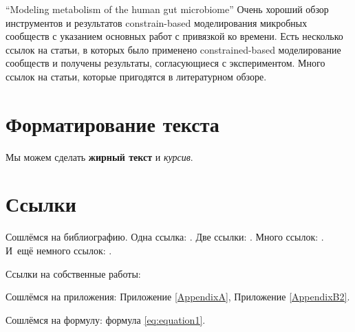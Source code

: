 “Modeling metabolism of the human gut microbiome”
Очень хороший обзор инструментов и результатов constrain-based моделирования микробных сообществ с указанием основных работ с привязкой ко времени. Есть несколько ссылок на статьи, в которых было применено constrained-based моделирование сообществ и получены результаты, согласующиеся с экспериментом. Много ссылок на статьи, которые пригодятся в литературном обзоре.

\section{Форматирование текста} \label{sect1_1}

Мы можем сделать \textbf{жирный текст} и \textit{курсив}.

\section{Ссылки} \label{sect1_2}
Сошлёмся на библиографию.
Одна ссылка: \cite[с.~54]{Sokolov}\cite[с.~36]{Gaidaenko}.
Две ссылки: \cite{Sokolov,Gaidaenko}.
Много ссылок: %
\cite{Lermontov,Management,Borozda,Marketing,Constitution,FamilyCode,Gost.7.0.53,Razumovski,Lagkueva,Pokrovski,Sirotko,Lukina,Methodology,Encyclopedia,Nasirova,Berestova,Kriger}.
И~ещё немного ссылок:
\cite{Article,Book,Booklet,Conference,Inbook,Incollection,Manual,Mastersthesis,Misc,Phdthesis,Proceedings,Techreport,Unpublished}.
\cite{medvedev2006jelektronnye, CEAT:CEAT581, doi:10.1080/01932691.2010.513279,Gosele1999161,Li2007StressAnalysis, Shoji199895,test:eisner-sample,test:eisner-sample-shorted,AB_patent_Pomerantz_1968,iofis_patent1960}



Ссылки на собственные работы:~\cite{vakbib1, confbib1}

Сошлёмся на приложения: Приложение \ref{AppendixA}, Приложение \ref{AppendixB2}.

Сошлёмся на формулу: формула \eqref{eq:equation1}.

